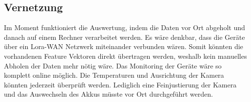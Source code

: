 \subsection{Vernetzung}
Im Moment funktioniert die Auswertung, indem die Daten vor Ort abgeholt und danach auf einem Rechner verarbeitet werden. Es wäre denkbar, dass die Geräte über ein Lora-WAN Netzwerk miteinander verbunden wären. Somit könnten die vorhandenen Feature Vektoren direkt übertragen werden, weshalb kein manuelles Abholen der Daten mehr nötig wäre. Das Monitoring der Geräte wäre so komplett online möglich. Die Temperaturen und Ausrichtung der Kamera könnten jederzeit überprüft werden. Lediglich eine Feinjustierung der Kamera und das Auswechseln des Akkus müsste vor Ort durchgeführt werden.